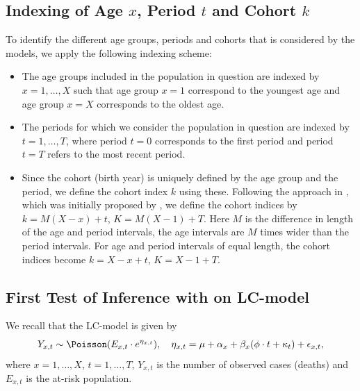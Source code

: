 \subsection{Indexing of Age $x$, Period $t$ and Cohort $k$}
To identify the different age groups, periods and cohorts that is considered by the models, we apply the following indexing scheme:
\begin{itemize}
    \item The age groups included in the population in question are indexed by $x = 1,\ldots,X$ such that age group $x=1$ correspond to the youngest age and age group $x=X$ corresponds to the oldest age.
    \item The periods for which we consider the population in question are indexed by $t=1,\ldots,T$, where period $t=0$ corresponds to the first period and period $t = T$ refers to the most recent period. 
    \item Since the cohort (birth year) is uniquely defined by the age group and the period, we define the cohort index $k$ using these. Following the approach in \cite{rieblerHeld2010}, which was initially proposed by \cite{Heuer1997}, we define the cohort indices by $k = M(X - x) + t$, $K = M(X - 1) + T$. Here $M$ is the difference in length of the age and period intervals, the age intervals are $M$ times wider than the period intervals. For age and period intervals of equal length, the cohort indices become $k = X - x + t$, $K = X - 1 + T.$
\end{itemize}

\subsection{First Test of Inference with \inlabru on LC-model}
\label{sec:synthFirstInferenceLC}
We recall that the LC-model is given by
\begin{equation}
    Y_{x,t} \sim \Poisson(E_{x,t}\cdot e^{\eta_{x,t}}), \quad \eta_{x,t} = \mu + \alpha_x + \beta_x(\phi \cdot t + \kappa_t) + \epsilon_{x,t},
    \label{eq:LC-rewritten-rep1}
\end{equation}
where $x = 1,\ldots,X$, $t = 1,\ldots,T$, $Y_{x,t}$ is the number of observed cases (deaths) and $E_{x,t}$ is the at-risk population.

